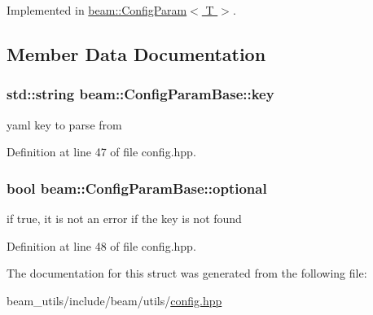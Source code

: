 Implemented in \hyperlink{classbeam_1_1_config_param_a805133e6dae35596e1383a6d223f4dc3}{beam\+::\+Config\+Param$<$ T $>$}.



\subsection{Member Data Documentation}
\subsubsection[{\texorpdfstring{key}{key}}]{\setlength{\rightskip}{0pt plus 5cm}std\+::string beam\+::\+Config\+Param\+Base\+::key}\hypertarget{structbeam_1_1_config_param_base_afbf349bc86d925088544d04a24c484b0}{}\label{structbeam_1_1_config_param_base_afbf349bc86d925088544d04a24c484b0}


yaml key to parse from 



Definition at line 47 of file config.\+hpp.

\subsubsection[{\texorpdfstring{optional}{optional}}]{\setlength{\rightskip}{0pt plus 5cm}bool beam\+::\+Config\+Param\+Base\+::optional}\hypertarget{structbeam_1_1_config_param_base_a4c73616a18786e1885265a02dbf8b9a5}{}\label{structbeam_1_1_config_param_base_a4c73616a18786e1885265a02dbf8b9a5}


if true, it is not an error if the key is not found 



Definition at line 48 of file config.\+hpp.



The documentation for this struct was generated from the following file\+:\begin{DoxyCompactItemize}
\item 
beam\+\_\+utils/include/beam/utils/\hyperlink{config_8hpp}{config.\+hpp}\end{DoxyCompactItemize}
